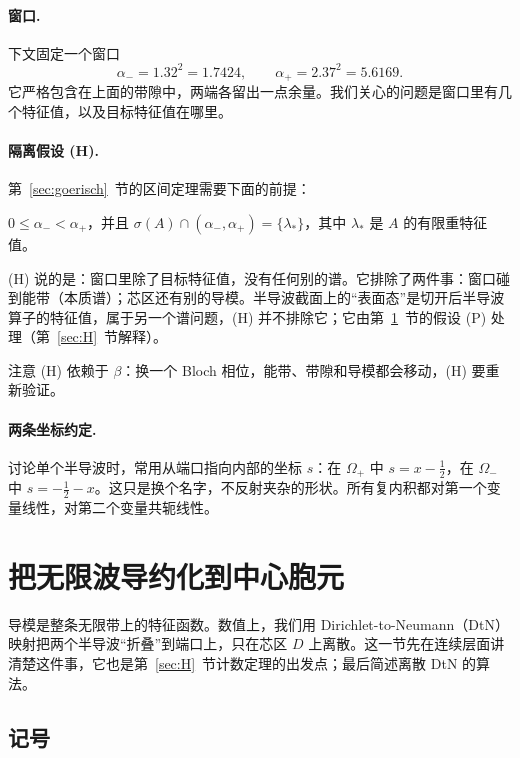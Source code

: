 \documentclass[11pt,a4paper,fontset=fandol]{ctexart}
\begin{document}
\paragraph{窗口.} 下文固定一个窗口
\begin{equation}
\label{eq:window}
\alpha_-=1.32^2=1.7424,\qquad \alpha_+=2.37^2=5.6169 .
\end{equation}
它严格包含在上面的带隙中，两端各留出一点余量。我们关心的问题是窗口里有几个特征值，以及目标特征值在哪里。

\paragraph{隔离假设 (H).} 第~\ref{sec:goerisch}~节的区间定理需要下面的前提：
\begin{assumption}[隔离假设 (H)]
\label{ass:H}
$0\le\alpha_-<\alpha_+$，并且 $\sigma(A)\cap(\alpha_-,\alpha_+)=\{\lambda_*\}$，其中 $\lambda_*$ 是 $A$ 的有限重特征值。
\end{assumption}
(H) 说的是：窗口里除了目标特征值，没有任何别的谱。它排除了两件事：窗口碰到能带（本质谱）；芯区还有别的导模。半导波截面上的“表面态”是切开后半导波算子的特征值，属于另一个谱问题，(H) 并不排除它；它由第~\ref{sec:dtn}~节的假设 (P) 处理（第~\ref{sec:H}~节解释）。

注意 (H) 依赖于 $\beta$：换一个 Bloch 相位，能带、带隙和导模都会移动，(H) 要重新验证。

\paragraph{两条坐标约定.} 讨论单个半导波时，常用从端口指向内部的坐标 $s$：在 $\Omega_+$ 中 $s=x-\tfrac12$，在 $\Omega_-$ 中 $s=-\tfrac12-x$。这只是换个名字，不反射夹杂的形状。所有复内积都对第一个变量线性，对第二个变量共轭线性。

\section{把无限波导约化到中心胞元}
\label{sec:dtn}
导模是整条无限带上的特征函数。数值上，我们用 Dirichlet-to-Neumann（DtN）映射把两个半导波“折叠”到端口上，只在芯区 $D$ 上离散。这一节先在连续层面讲清楚这件事，它也是第~\ref{sec:H}~节计数定理的出发点；最后简述离散 DtN 的算法。

\subsection{记号}
\end{document}
